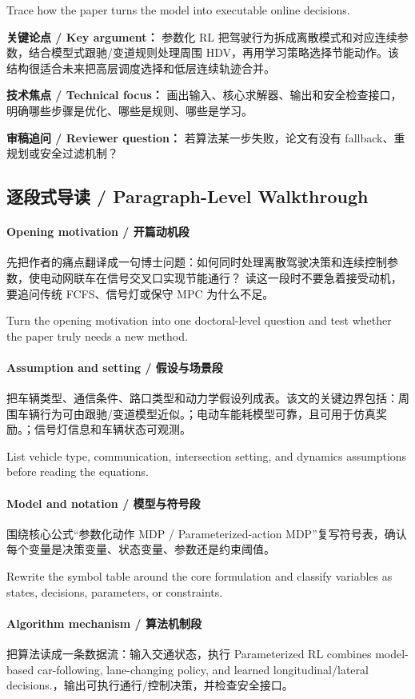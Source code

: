 \documentclass[UTF8,a4paper,11pt,fontset=fandol]{ctexart}
\begin{document}
Trace how the paper turns the model into executable online decisions.

\textbf{关键论点 / Key argument：} 参数化 RL 把驾驶行为拆成离散模式和对应连续参数，结合模型式跟驰/变道规则处理周围 HDV，再用学习策略选择节能动作。该结构很适合未来把高层调度选择和低层连续轨迹合并。

\textbf{技术焦点 / Technical focus：} 画出输入、核心求解器、输出和安全检查接口，明确哪些步骤是优化、哪些是规则、哪些是学习。

\textbf{审稿追问 / Reviewer question：} 若算法某一步失败，论文有没有 fallback、重规划或安全过滤机制？


\subsection{逐段式导读 / Paragraph-Level Walkthrough}
\paragraph{Opening motivation / 开篇动机段}先把作者的痛点翻译成一句博士问题：如何同时处理离散驾驶决策和连续控制参数，使电动网联车在信号交叉口实现节能通行？ 读这一段时不要急着接受动机，要追问传统 FCFS、信号灯或保守 MPC 为什么不足。

Turn the opening motivation into one doctoral-level question and test whether the paper truly needs a new method.

\paragraph{Assumption and setting / 假设与场景段}把车辆类型、通信条件、路口类型和动力学假设列成表。该文的关键边界包括：周围车辆行为可由跟驰/变道模型近似。；电动车能耗模型可靠，且可用于仿真奖励。；信号灯信息和车辆状态可观测。

List vehicle type, communication, intersection setting, and dynamics assumptions before reading the equations.

\paragraph{Model and notation / 模型与符号段}围绕核心公式“参数化动作 MDP / Parameterized-action MDP”复写符号表，确认每个变量是决策变量、状态变量、参数还是约束阈值。

Rewrite the symbol table around the core formulation and classify variables as states, decisions, parameters, or constraints.

\paragraph{Algorithm mechanism / 算法机制段}把算法读成一条数据流：输入交通状态，执行 Parameterized RL combines model-based car-following, lane-changing policy, and learned longitudinal/lateral decisions.，输出可执行通行/控制决策，并检查安全接口。
\end{document}
